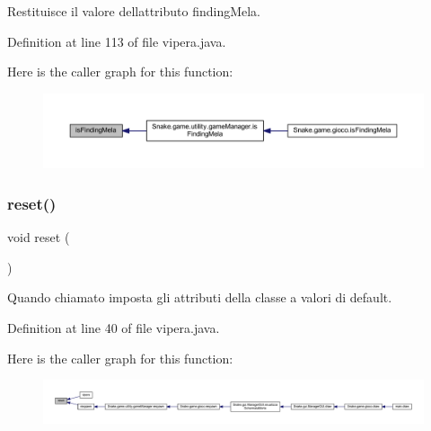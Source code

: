 Restituisce il valore dell\textquotesingle{}attributo finding\+Mela. 



Definition at line 113 of file vipera.\+java.

Here is the caller graph for this function\+:
\nopagebreak
\begin{figure}[H]
\begin{center}
\leavevmode
\includegraphics[width=350pt]{class_snake_1_1game_1_1vipera_1_1vipera_ad36cea66da3e5e8f3a9fdd8decd6f70b_icgraph}
\end{center}
\end{figure}
\mbox{\label{class_snake_1_1game_1_1vipera_1_1vipera_ad20897c5c8bd47f5d4005989bead0e55}} 
\subsubsection{\texorpdfstring{reset()}{reset()}}
{\footnotesize\ttfamily void reset (\begin{DoxyParamCaption}{ }\end{DoxyParamCaption})\hspace{0.3cm}{\ttfamily [private]}}



Quando chiamato imposta gli attributi della classe a valori di default. 



Definition at line 40 of file vipera.\+java.

Here is the caller graph for this function\+:
\nopagebreak
\begin{figure}[H]
\begin{center}
\leavevmode
\includegraphics[width=350pt]{class_snake_1_1game_1_1vipera_1_1vipera_ad20897c5c8bd47f5d4005989bead0e55_icgraph}
\end{center}
\end{figure}
\mbox{\label{class_snake_1_1game_1_1vipera_1_1vipera_ac578ca44493fe34e6cb1b2093cf79341}} 
